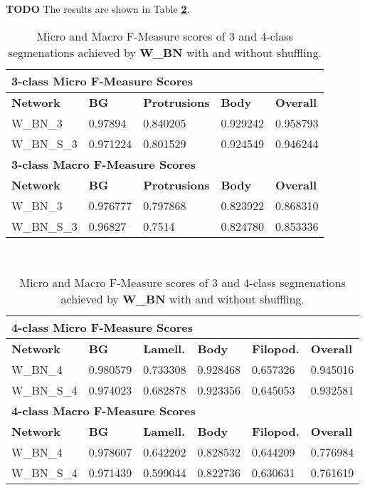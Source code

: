 \textbf{TODO} The results are shown in Table \textbf{\ref{tab:results3}}. \\


\begin {table}
	\begin{flushleft}
		\begin {tabular}[!htb]{|l|l|l|l|l|}
			\hline\multicolumn{5}{|l|}{\textbf{3-class Micro F-Measure Scores}} \\ \hline
			\textbf{Network}& \textbf{BG}& \textbf{Protrusions}& \textbf{Body}& \textbf{Overall} \\ \hline
			W\_BN\_3& \cellcolor{green!25}0.97894& \cellcolor{green!25}0.840205& \cellcolor{green!25}0.929242& \cellcolor{green!25}0.958793 \\ \hline
			W\_BN\_S\_3& 0.971224& 0.801529& 0.924549& 0.946244 \\ \hline
			\multicolumn{5}{|l|}{\textbf{3-class Macro F-Measure Scores}} \\ \hline
			\textbf{Network}& \textbf{BG}& \textbf{Protrusions}& \textbf{Body}& \textbf{Overall} \\ \hline
			W\_BN\_3& \cellcolor{green!25}0.976777& \cellcolor{green!25}0.797868& 0.823922& \cellcolor{green!25}0.868310 \\ \hline
			W\_BN\_S\_3& 0.96827& 0.7514& \cellcolor{green!25}0.824780& 0.853336 \\ \hline
		\end {tabular}
		\vspace{0.5cm}\\
		\begin {tabular}[!htb]{|l|l|l|l|l|l|}
			\hline\multicolumn{6}{|l|}{\textbf{4-class Micro F-Measure Scores}} \\ \hline
			\textbf{Network}& \textbf{BG}& \textbf{Lamell.}& \textbf{Body}& \textbf{Filopod.}& \textbf{Overall} \\ \hline
			W\_BN\_4& \cellcolor{green!25}0.980579& \cellcolor{green!25}0.733308& \cellcolor{green!25}0.928468& \cellcolor{green!25}0.657326& \cellcolor{green!25}0.945016 \\ \hline
			W\_BN\_S\_4& 0.974023& 0.682878& 0.923356& 0.645053& 0.932581 \\ \hline
			\multicolumn{6}{|l|}{\textbf{4-class Macro F-Measure Scores}} \\ \hline
			\textbf{Network}& \textbf{BG}& \textbf{Lamell.}& \textbf{Body}& \textbf{Filopod.}& \textbf{Overall} \\ \hline
			W\_BN\_4& \cellcolor{green!25}0.978607& \cellcolor{green!25}0.642202& \cellcolor{green!25}0.828532& \cellcolor{green!25}0.644209& \cellcolor{green!25}0.776984 \\ \hline
			W\_BN\_S\_4& 0.971439& 0.599044& 0.822736& 0.630631& 0.761619 \\ \hline
		\end {tabular}
	\end {flushleft}

\caption[Micro and Macro F-Measure scores for a network with Batch Normalization and with or without shuffling.]{Micro and Macro F-Measure scores of 3 and 4-class segmenations achieved by \textbf{W\_BN} with and without shuffling.}
\label{tab:results3}
\end {table}


